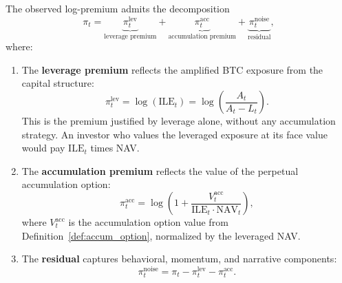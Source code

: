 \begin{theorem}
\label{thm:premium_decomp}
The observed log-premium admits the decomposition
\begin{equation}
\label{eq:premium_three}
  \pi_t = \underbrace{\pi_t^{\mathrm{lev}}}_{\text{leverage premium}} + \underbrace{\pi_t^{\mathrm{acc}}}_{\text{accumulation premium}} + \underbrace{\pi_t^{\mathrm{noise}}}_{\text{residual}},
\end{equation}
where:
\begin{enumerate}
  \item The \textbf{leverage premium} reflects the amplified BTC exposure from the capital structure:
  \begin{equation}
  \label{eq:pi_leverage}
    \pi_t^{\mathrm{lev}} = \log(\mathrm{ILE}_t) = \log\!\left(\frac{A_t}{A_t - L_t}\right).
  \end{equation}
  This is the premium justified by leverage alone, without any accumulation strategy. An investor who values the leveraged exposure at its face value would pay $\mathrm{ILE}_t$ times NAV.

  \item The \textbf{accumulation premium} reflects the value of the perpetual accumulation option:
  \begin{equation}
  \label{eq:pi_accumulation}
    \pi_t^{\mathrm{acc}} = \log\!\left(1 + \frac{V_t^{\mathrm{acc}}}{\mathrm{ILE}_t \cdot \mathrm{NAV}_t}\right),
  \end{equation}
  where $V_t^{\mathrm{acc}}$ is the accumulation option value from Definition~\ref{def:accum_option}, normalized by the leveraged NAV.

  \item The \textbf{residual} captures behavioral, momentum, and narrative components:
  \begin{equation}
  \label{eq:pi_noise}
    \pi_t^{\mathrm{noise}} = \pi_t - \pi_t^{\mathrm{lev}} - \pi_t^{\mathrm{acc}}.
  \end{equation}
\end{enumerate}
\end{theorem}


